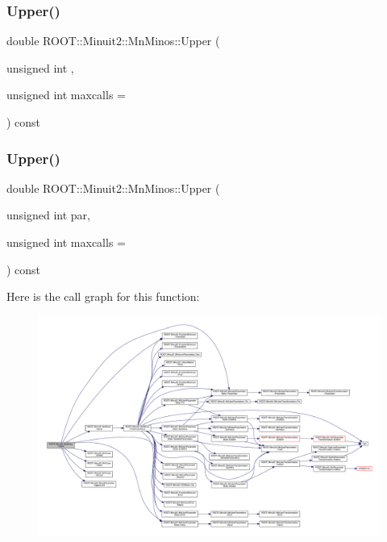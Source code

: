 \subsubsection{\texorpdfstring{Upper()}{Upper()}\hspace{0.1cm}{\footnotesize\ttfamily [1/2]}}
{\footnotesize\ttfamily double R\+O\+O\+T\+::\+Minuit2\+::\+Mn\+Minos\+::\+Upper (\begin{DoxyParamCaption}\item[{unsigned int}]{,  }\item[{unsigned int}]{maxcalls = {} }\end{DoxyParamCaption}) const}

\mbox{\label{classROOT_1_1Minuit2_1_1MnMinos_a387b76e3135998c519db7e6ae4cc3d90}} 
\subsubsection{\texorpdfstring{Upper()}{Upper()}\hspace{0.1cm}{\footnotesize\ttfamily [2/2]}}
{\footnotesize\ttfamily double R\+O\+O\+T\+::\+Minuit2\+::\+Mn\+Minos\+::\+Upper (\begin{DoxyParamCaption}\item[{unsigned int}]{par,  }\item[{unsigned int}]{maxcalls = {} }\end{DoxyParamCaption}) const}

Here is the call graph for this function\+:\nopagebreak
\begin{figure}[H]
\begin{center}
\leavevmode
\includegraphics[width=350pt]{dc/d91/classROOT_1_1Minuit2_1_1MnMinos_a387b76e3135998c519db7e6ae4cc3d90_cgraph}
\end{center}
\end{figure}
\mbox{\label{classROOT_1_1Minuit2_1_1MnMinos_a6fb073e7f84cb2d038714e362eda732a}} 
